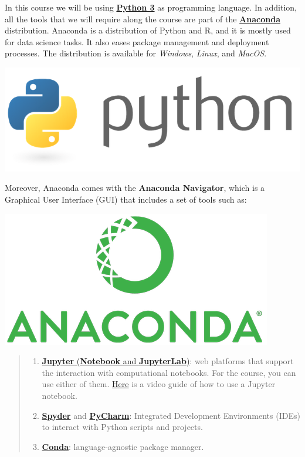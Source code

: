 \documentclass{latex-template/tufte-handout}
\begin{document}
In this course we will be using \href{https://www.python.org}{\textbf{Python 3}} as programming language. In addition, all the tools that we will require along the course are part of the \href{https://anaconda.org}{\textbf{Anaconda}} distribution. 
Anaconda is a distribution of Python and R, and it is mostly used for data science tasks. It also eases package management and deployment processes. The distribution is available for \emph{Windows}, \emph{Linux}, and \emph{MacOS}.
\begin{marginfigure}%
  \includegraphics[width=\linewidth]{assets/python-logo}
  \label{fig:marginfig}
\end{marginfigure}

Moreover, Anaconda comes with the \textbf{Anaconda Navigator}, which is
a Graphical User Interface (GUI) that includes a set of tools such as:
\begin{marginfigure}%
  \includegraphics[width=\linewidth]{assets/anaconda-logo}
  \label{fig:marginfig}
\end{marginfigure}

\begin{quote}
\begin{enumerate}
\item
  \href{https://jupyter.org}{\textbf{Jupyter} (\textbf{Notebook} and
  \textbf{JupyterLab})}: web platforms that support the interaction with
  computational notebooks. For the course, you can use either of them.  \href{https://canvas.vu.nl/files/5301230/download?download_frd=1}{Here} is a video guide of how to use a Jupyter notebook.
\item
  \href{https://www.spyder-ide.org}{\textbf{Spyder}} and
  \href{https://www.jetbrains.com/pycharm/}{\textbf{PyCharm}}:
  Integrated Development Environments (IDEs) to interact with Python
  scripts and projects.
\item
  \href{https://docs.conda.io/en/latest/}{\textbf{Conda}}:
  language-agnostic package manager.
\end{enumerate}
\end{quote}
\end{document}
